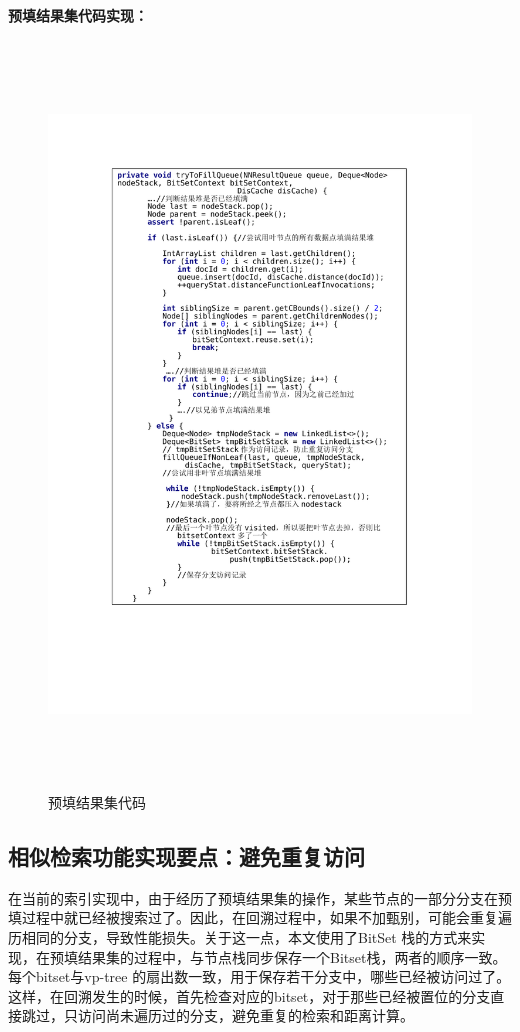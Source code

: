 \textbf{预填结果集代码实现：}
\begin{figure}[H]
  \centering
  \includegraphics[width=5.8in,height=7.8in]{new_FIGs/chapter4/trytoFillQueue-code.pdf}
  \caption{预填结果集代码}\label{trytoFillQueue-code}
\end{figure}
\subsection{相似检索功能实现要点：避免重复访问}
在当前的索引实现中，由于经历了预填结果集的操作，某些节点的一部分分支在预填过程中就已经被搜索过了。因此，在回溯过程中，如果不加甄别，可能会重复遍历相同的分支，导致性能损失。关于这一点，本文使用了BitSet 栈的方式来实现，在预填结果集的过程中，与节点栈同步保存一个Bitset栈，两者的顺序一致。每个bitset与vp-tree 的扇出数一致，用于保存若干分支中，哪些已经被访问过了。这样，在回溯发生的时候，首先检查对应的bitset，对于那些已经被置位的分支直接跳过，只访问尚未遍历过的分支，避免重复的检索和距离计算。

